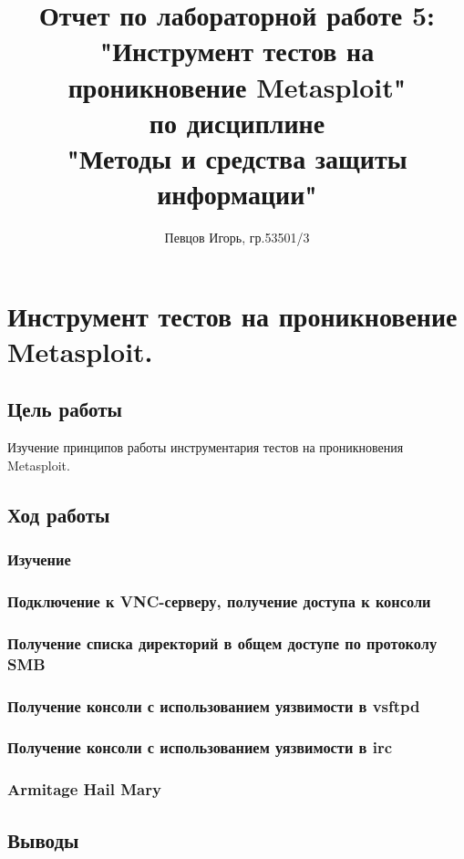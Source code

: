 \documentclass[a4paper, 14pt]{article}				%
\author{Певцов Игорь, гр.53501/3}
\title{Отчет по лабораторной работе 5:\\"Инструмент тестов на проникновение Metasploit"\\ по дисциплине\\"Методы и средства защиты информации"}
\begin{document}
\maketitle

\newpage
\tableofcontents{}

\newpage
\section{Инструмент тестов на проникновение Metasploit.}

\subsection{Цель работы}
Изучение принципов работы инструментария тестов на проникновения Metasploit.
\subsection{Ход работы}



\subsubsection{Изучение}



\subsubsection{Подключение к VNC-серверу, получение доступа к консоли}



\subsubsection{Получение списка директорий в общем доступе по протоколу SMB}



\subsubsection{Получение консоли с использованием уязвимости в vsftpd}



\subsubsection{Получение консоли с использованием уязвимости в irc}


\subsubsection{Armitage Hail Mary}


\subsection{Выводы}
\end{document}
